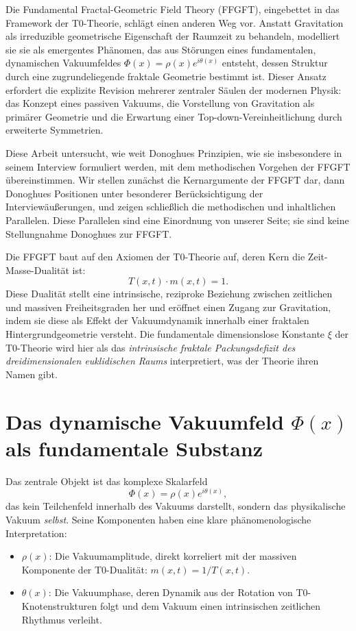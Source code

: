 	Die Fundamental Fractal-Geometric Field Theory (FFGFT), eingebettet in das Framework der T0-Theorie, schlägt einen anderen Weg vor. Anstatt Gravitation als irreduzible geometrische Eigenschaft der Raumzeit zu behandeln, modelliert sie sie als emergentes Phänomen, das aus Störungen eines fundamentalen, dynamischen Vakuumfeldes $\Phi(x) = \rho(x) e^{i\theta(x)}$ entsteht, dessen Struktur durch eine zugrundeliegende fraktale Geometrie bestimmt ist. Dieser Ansatz erfordert die explizite Revision mehrerer zentraler Säulen der modernen Physik: das Konzept eines passiven Vakuums, die Vorstellung von Gravitation als primärer Geometrie und die Erwartung einer Top-down-Vereinheitlichung durch erweiterte Symmetrien.
	
	Diese Arbeit untersucht, wie weit Donoghues Prinzipien, wie sie insbesondere in seinem Interview \cite{DonoghueInterview2025} formuliert werden, mit dem methodischen Vorgehen der FFGFT übereinstimmen. Wir stellen zunächst die Kernargumente der FFGFT dar, dann Donoghues Positionen unter besonderer Berücksichtigung der Interviewäußerungen, und zeigen schließlich die methodischen und inhaltlichen Parallelen. Diese Parallelen sind eine Einordnung von unserer Seite; sie sind keine Stellungnahme Donoghues zur FFGFT.
	
	
	Die FFGFT baut auf den Axiomen der T0-Theorie auf, deren Kern die Zeit-Masse-Dualität ist:
	\[
	T(x,t) \cdot m(x,t) = 1.
	\]
	Diese Dualität stellt eine intrinsische, reziproke Beziehung zwischen zeitlichen und massiven Freiheitsgraden her und eröffnet einen Zugang zur Gravitation, indem sie diese als Effekt der Vakuumdynamik innerhalb einer fraktalen Hintergrundgeometrie versteht. Die fundamentale dimensionslose Konstante $\xi$ der T0-Theorie wird hier als das \emph{intrinsische fraktale Packungsdefizit des dreidimensionalen euklidischen Raums} interpretiert, was der Theorie ihren Namen gibt.
	
	\section{Das dynamische Vakuumfeld \texorpdfstring{$\Phi(x)$}{Phi(x)} als fundamentale Substanz}
	
	Das zentrale Objekt ist das komplexe Skalarfeld
	\[
	\Phi(x) = \rho(x) e^{i\theta(x)},
	\]
	das kein Teilchenfeld innerhalb des Vakuums darstellt, sondern das physikalische Vakuum \emph{selbst}. Seine Komponenten haben eine klare phänomenologische Interpretation:
	\begin{itemize}
		\item $\rho(x)$: Die Vakuumamplitude, direkt korreliert mit der massiven Komponente der T0-Dualität: $m(x,t) = 1/T(x,t)$.
		\item $\theta(x)$: Die Vakuumphase, deren Dynamik aus der Rotation von T0-Knotenstrukturen folgt und dem Vakuum einen intrinsischen zeitlichen Rhythmus verleiht.
	\end{itemize}
	
